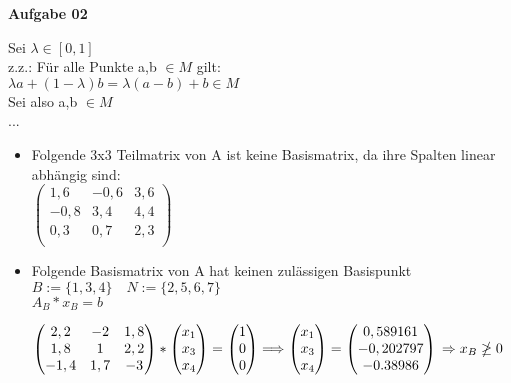 \documentclass[a4paper,10pt]{article}
\begin{document}
	\textbf{Aufgabe 02}\\
	\begin{compactenum} [(a)]
		\item Sei $ \lambda \in [0,1] $\\
		z.z.: Für alle Punkte a,b $ \in M $ gilt:\\
		$ \lambda a + (1- \lambda) b = \lambda (a-b) + b \in M $\\
		Sei also a,b $ \in M $\\
		...
		\\
		\item \begin{itemize}
			\item Folgende 3x3 Teilmatrix von A ist keine Basismatrix, da ihre Spalten linear abhängig sind:\\
			$\begin{pmatrix}
				1,6 & -0,6 & 3,6\\
				-0,8 & 3,4 & 4,4\\
				0,3 & 0,7 & 2,3\\
			\end{pmatrix}$
			\item Folgende Basismatrix von A hat keinen zulässigen Basispunkt\\
			$ B := \{1,3,4\} \quad N := \{2,5,6,7\} $\\
			$ A_B * x_B = b $
			
			$ \begin{pmatrix}
			2,2 & -2 & 1,8\\
			1,8 & 1 & 2,2\\
			-1,4 & 1,7 & -3\\
			\end{pmatrix} * 
			\begin{pmatrix}
			x_1 \\
			x_3 \\
			x_4\\
			\end{pmatrix} = 
			\begin{pmatrix}
			1\\
			0\\
			0\\
			\end{pmatrix}
			\Longrightarrow
				\begin{pmatrix}
				x_1 \\
				x_3 \\
				x_4\\
				\end{pmatrix} = 
				\begin{pmatrix}
				0,589161\\
				-0,202797\\
				-0.38986\\
				\end{pmatrix}\\
			\Rightarrow x_B \ngeq 0$
		\end{itemize}
	\end{compactenum}
	
	
\end{document}
